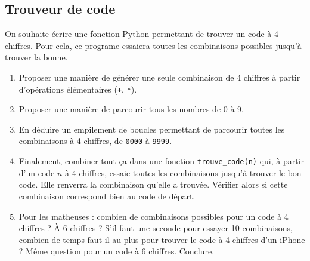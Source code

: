 \documentclass[12pt,a4paper, oneside]{article}
\begin{document}
   \subsection{Trouveur de code}\label{subsec:trouveur-de-code}
   On souhaite écrire une fonction Python permettant de trouver un code à 4 chiffres.
   Pour cela, ce programe essaiera toutes les combinaisons possibles jusqu'à trouver la bonne.
   \begin{enumerate}
      \item Proposer une manière de générer une seule combinaison de 4 chiffres à partir d'opérations élémentaires (\texttt{+}, \texttt{*}).
      \item Proposer une manière de parcourir tous les nombres de 0 à 9.
      \item En déduire un empilement de boucles permettant de parcourir toutes les combinaisons à 4 chiffres, de \texttt{0000} à \texttt{9999}.
      \item Finalement, combiner tout ça dans une fonction \texttt{trouve\_code(n)} qui, à partir d'un code $n$ à 4 chiffres, essaie toutes les combinaisons jusqu'à trouver le bon code.
      Elle renverra la combinaison qu'elle a trouvée.
      Vérifier alors si cette combinaison correspond bien au code de départ.
      \item Pour les matheuses : combien de combinaisons possibles pour un code à 4 chiffres ?
      À 6 chiffres ?
      S'il faut une seconde pour essayer 10 combinaisons, combien de temps faut-il au plus pour trouver le code à 4 chiffres d'un iPhone ?
      Même question pour un code à 6 chiffres.
      Conclure.
   \end{enumerate}

\end{document}
